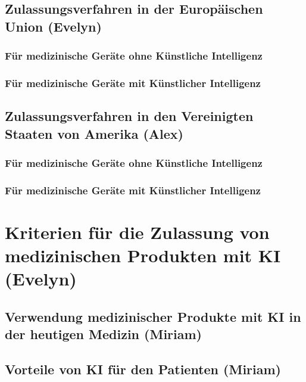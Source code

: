 \documentclass[a4paper, 11pt]{article}
\begin{document}
		\subsection{Zulassungsverfahren in der Europäischen Union \small{(Evelyn)}}\label{sec:europe}
			
			\subsubsection{Für medizinische Geräte ohne Künstliche Intelligenz}\label{sec:europe-no-ai}
				
			\subsubsection{Für medizinische Geräte mit Künstlicher Intelligenz}\label{sec:europe-with-ai}
				
		\subsection{Zulassungsverfahren in den Vereinigten Staaten von Amerika \small{(Alex)}}\label{sec:us}
			
			\subsubsection{Für medizinische Geräte ohne Künstliche Intelligenz}\label{sec:us-no-ai}
				
			\subsubsection{Für medizinische Geräte mit Künstlicher Intelligenz}\label{sec:us-with-ai}
				

	\newpage
	\section{Kriterien für die Zulassung von medizinischen Produkten mit KI  \small{(Evelyn)}}\label{sec:analysis}
				
			\subsection{Verwendung medizinischer Produkte mit KI in der heutigen Medizin \small{(Miriam)}}\label{sec:ki-today}
				
			\subsection{Vorteile von KI für den Patienten \small{(Miriam)}}\label{sec:ki-advantages}
				
\end{document}
